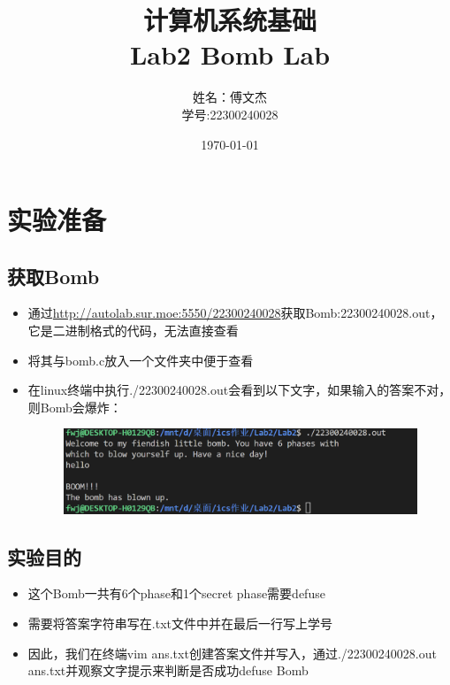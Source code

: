 \documentclass[12pt, a4paper, oneside]{ctexart}
\title{计算机系统基础 \\ Lab2 Bomb Lab} %
\author{姓名：傅文杰\\学号:22300240028} %
\date{\today} %
\begin{document}
\maketitle %

\tableofcontents %

\section{实验准备} %
\subsection{获取Bomb}
\begin{itemize}
    \item 通过\href{http://autolab.sur.moe:5550/22300240028}{http://autolab.sur.moe:5550/22300240028}获取Bomb:22300240028.out，它是二进制格式的代码，无法直接查看
    \item 将其与bomb.c放入一个文件夹中便于查看 \\
    \item 在linux终端中执行./22300240028.out会看到以下文字，如果输入的答案不对，则Bomb会爆炸：\\
    \begin{figure}[htbp]
        \includegraphics[scale=0.9]{image/1.1-1.png}
    \end{figure}    
\end{itemize}

\subsection{实验目的}
\begin{itemize}
    \item 这个Bomb一共有6个phase和1个secret phase需要defuse
    \item 需要将答案字符串写在.txt文件中并在最后一行写上学号
    \item 因此，我们在终端vim ans.txt创建答案文件并写入，通过./22300240028.out ans.txt并观察文字提示来判断是否成功defuse Bomb
\end{itemize}
\end{document}
